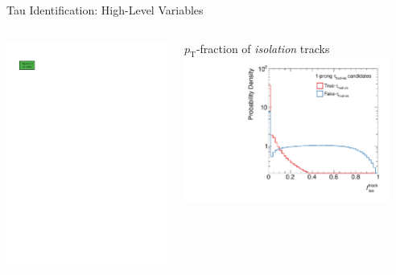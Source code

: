 \documentclass[11pt, xcolor={dvipsnames}, aspectratio=169]{beamer}
\begin{document}
\begin{frame}{Tau Identification: High-Level Variables}
  \begin{columns}[onlytextwidth]
     \centering

    \includegraphics[scale=1]{tauid/high_level_icon}


    \begin{columns}[onlytextwidth]
      \centering

      $p_{\text{T}}$-fraction of \emph{isolation} tracks\\[0.2em]

      \includegraphics[width=0.9\textwidth]{tauid/invars/invars_sumpttrkfrac_1P}


\end{columns}
\end{columns}
\end{frame}
\end{document}
